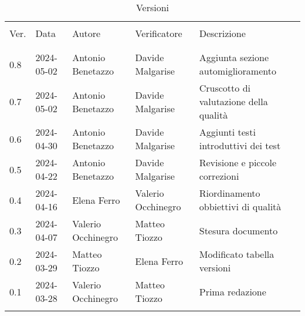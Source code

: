\documentclass[italian,12pt]{article} %
\begin{document}

\newpage

\captionsetup[table]{list=no}
\begin{table}[!h]
	\caption*{Versioni}
	\footnotesize
	\begin{center}
		\begin{tabular}{ l l l l l }
			\hline                                                                                            \\[-2ex]
			Ver. & Data       & Autore             & Verificatore       & Descrizione                         \\
			\\[-2ex] \hline \\[-1.5ex]
			0.8  & 2024-05-02 & Antonio Benetazzo  & Davide Malgarise   & Aggiunta sezione automiglioramento     \\
			0.7  & 2024-05-02 & Antonio Benetazzo  & Davide Malgarise   & Cruscotto di valutazione della qualità \\
			0.6  & 2024-04-30 & Antonio Benetazzo  & Davide Malgarise   & Aggiunti testi introduttivi dei test   \\
			0.5  & 2024-04-22 & Antonio Benetazzo  & Davide Malgarise   & Revisione e piccole correzioni         \\
			0.4  & 2024-04-16 & Elena Ferro        & Valerio Occhinegro & Riordinamento obbiettivi di qualità    \\
			0.3  & 2024-04-07 & Valerio Occhinegro & Matteo Tiozzo      & Stesura documento                      \\
			0.2  & 2024-03-29 & Matteo Tiozzo      & Elena Ferro        & Modificato tabella versioni            \\
			0.1  & 2024-03-28 & Valerio Occhinegro & Matteo Tiozzo      & Prima redazione                        \\
			\\[-1.5ex] \hline
		\end{tabular}
	\end{center}
\end{table}
\captionsetup[table]{list=yes}
\newpage
\tableofcontents
\listoftables
\listoffigures
\newpage





\end{document}
